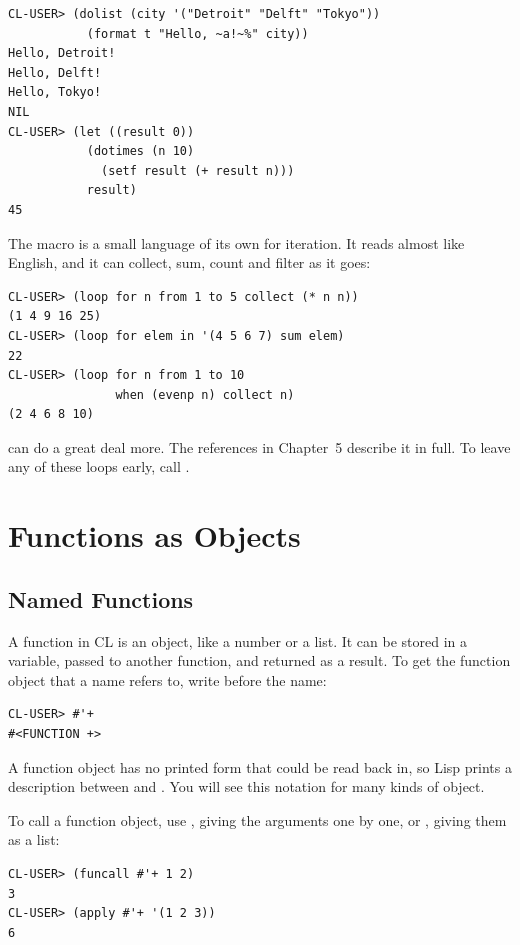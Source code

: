\begin{verbatim}
CL-USER> (dolist (city '("Detroit" "Delft" "Tokyo"))
           (format t "Hello, ~a!~%" city))
Hello, Detroit!
Hello, Delft!
Hello, Tokyo!
NIL
CL-USER> (let ((result 0))
           (dotimes (n 10)
             (setf result (+ result n)))
           result)
45
\end{verbatim}

The  macro is a small language of its own for iteration.
It reads almost like English, and it can collect, sum, count and
filter as it goes:

\begin{verbatim}
CL-USER> (loop for n from 1 to 5 collect (* n n))
(1 4 9 16 25)
CL-USER> (loop for elem in '(4 5 6 7) sum elem)
22
CL-USER> (loop for n from 1 to 10
               when (evenp n) collect n)
(2 4 6 8 10)
\end{verbatim}

 can do a great deal more. The references in Chapter~5
describe it in full. To leave any of these loops early, call
.

\section{Functions as Objects}
\label{sec:functions}

\subsection{Named Functions}

A function in CL is an object, like a number or a list. It can be
stored in a variable, passed to another function, and returned as a
result. To get the function object that a name refers to, write
\code{\#\q} before the name:

\begin{verbatim}
CL-USER> #'+
#<FUNCTION +>
\end{verbatim}

A function object has no printed form that could be read back in, so
Lisp prints a description between \code{\#<} and \code{>}. You will
see this notation for many kinds of object.

To call a function object, use , giving the arguments
one by one, or , giving them as a list:

\begin{verbatim}
CL-USER> (funcall #'+ 1 2)
3
CL-USER> (apply #'+ '(1 2 3))
6
\end{verbatim}

